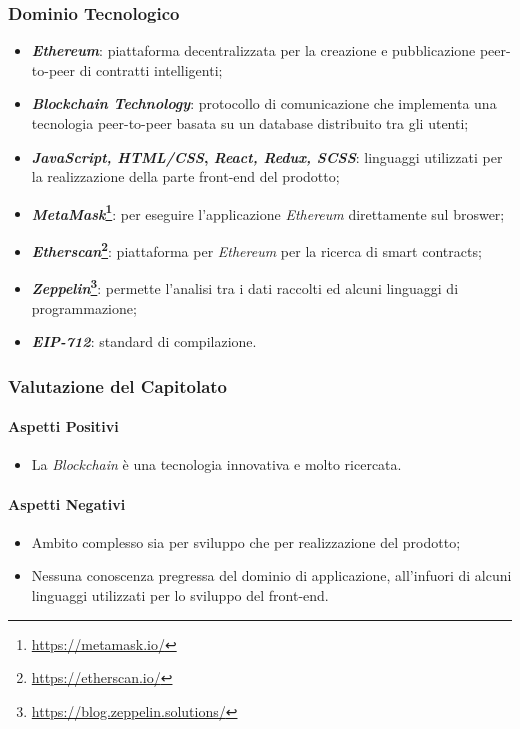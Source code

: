 \subsubsection{Dominio Tecnologico}

\begin{itemize}
  \item \textbf{\textit{Ethereum}\glossario}: piattaforma decentralizzata per la creazione e pubblicazione peer-to-peer di contratti intelligenti;
  \item \textbf{\textit{Blockchain Technology}\glossario}: protocollo di comunicazione che implementa una tecnologia peer-to-peer basata su un database distribuito tra gli utenti;
  \item \textbf{\textit{JavaScript, HTML/CSS},  \textit{React\glossario, Redux\glossario, SCSS\glossario}}: linguaggi utilizzati per la realizzazione della parte front-end del prodotto;
  \item \textbf{\textit{MetaMask}\footnote{\url{https://metamask.io/}}\glossario}: per eseguire l'applicazione \textit{Ethereum} direttamente sul broswer;
  \item \textbf{\textit{Etherscan}\footnote{\url{https://etherscan.io/}}\glossario}: piattaforma per \textit{Ethereum} per la ricerca di smart contracts;
  \item \textbf{\textit{Zeppelin}\footnote{\url{https://blog.zeppelin.solutions/}}\glossario}: permette l'analisi tra i dati raccolti ed alcuni linguaggi di programmazione;
  \item \textbf{\textit{EIP-712}}: standard di compilazione.
\end{itemize}

\subsubsection{Valutazione del Capitolato}
\paragraph{Aspetti Positivi}
\begin{itemize}
  \item La \textit{Blockchain} è una tecnologia innovativa e molto ricercata.
\end{itemize}

\paragraph{Aspetti Negativi}
\begin{itemize}
  \item Ambito complesso sia per sviluppo che per realizzazione del prodotto;
  \item Nessuna conoscenza pregressa del dominio di applicazione, all'infuori di alcuni linguaggi utilizzati per lo sviluppo del front-end.
\end{itemize}

